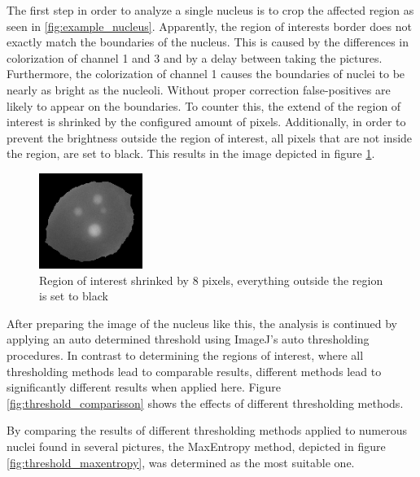 \documentclass[a4paper, 12pt]{article}
\begin{document}
The first step in order to analyze a single nucleus is to crop the affected
region as seen in \ref{fig:example_nucleus}. Apparently, the region of interests
border does not exactly match the boundaries of the nucleus. This is caused by
the differences in colorization of channel 1 and 3 and by a delay between taking
the pictures. Furthermore, the colorization of channel 1 causes the boundaries
of nuclei to be nearly as bright as the nucleoli. Without proper correction
false-positives are likely to appear on the boundaries. To counter this, the
extend of the region of interest is shrinked by the configured amount of pixels.
Additionally, in order to prevent the brightness outside the region of interest,
all pixels that are not inside the region, are set to black. This results in the
image depicted in figure \ref{fig:example_nucleus_shrinked_blacked}.

\begin{figure}
\vspace{-14pt}
\includegraphics[width=0.3\textwidth]{images/example_nucleus_shrinked8_blacked}
\caption{Region of interest shrinked by 8 pixels, everything outside the region
is set to black}
\label{fig:example_nucleus_shrinked_blacked}
\end{figure}

After preparing the image of the nucleus like this, the analysis is continued by
applying an auto determined threshold using ImageJ's auto thresholding
procedures. In contrast to determining the regions of interest, where all
thresholding methods lead to comparable results, different methods lead to
significantly different results when applied here. Figure
\ref{fig:threshold_comparisson} shows the effects of different thresholding
methods.

By comparing the results of different thresholding methods applied to numerous
nuclei found in several pictures, the MaxEntropy method, depicted in figure
\ref{fig:threshold_maxentropy}, was determined as the most suitable one.
\end{document}
